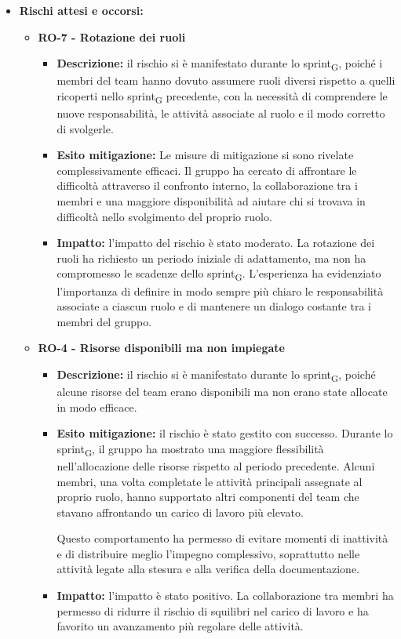 ﻿\documentclass[a4paper, 10pt, colorlinks=true, linkcolor=black, urlcolor=blue, citecolor=blue, hidelinks]{article}
\begin{document}
\begin{itemize}
    \item \textbf{Rischi attesi e occorsi:}

    \begin{itemize}
        \item \textbf{RO-7 - Rotazione dei ruoli}
        \begin{itemize}
            \item \textbf{Descrizione:} il rischio si è manifestato durante lo sprint\textsubscript{G}, poiché i membri del team hanno dovuto assumere ruoli diversi rispetto a quelli ricoperti nello sprint\textsubscript{G} precedente, con la necessità di comprendere le nuove responsabilità, le attività associate al ruolo e il modo corretto di svolgerle.

            \item \textbf{Esito mitigazione:} Le misure di mitigazione si sono rivelate complessivamente efficaci. Il gruppo ha cercato di affrontare le difficoltà attraverso il confronto interno, la collaborazione tra i membri e una maggiore disponibilità ad aiutare chi si trovava in difficoltà nello svolgimento del proprio ruolo.

            \item \textbf{Impatto:} l'impatto del rischio è stato moderato. La rotazione dei ruoli ha richiesto un periodo iniziale di adattamento, ma non ha compromesso le scadenze dello sprint\textsubscript{G}. L'esperienza ha evidenziato l'importanza di definire in modo sempre più chiaro le responsabilità associate a ciascun ruolo e di mantenere un dialogo costante tra i membri del gruppo.
        \end{itemize}
        \item \textbf{RO-4 - Risorse disponibili ma non impiegate}
        \begin{itemize}
            \item \textbf{Descrizione:} il rischio si è manifestato durante lo sprint\textsubscript{G}, poiché alcune risorse del team erano disponibili ma non erano state allocate in modo efficace. 
            \item \textbf{Esito mitigazione:} il rischio è stato gestito con successo. Durante lo sprint\textsubscript{G}, il gruppo ha mostrato una maggiore flessibilità nell'allocazione delle risorse rispetto al periodo precedente. Alcuni membri, una volta completate le attività principali assegnate al proprio ruolo, hanno supportato altri componenti del team che stavano affrontando un carico di lavoro più elevato.

            Questo comportamento ha permesso di evitare momenti di inattività e di distribuire meglio l'impegno complessivo, soprattutto nelle attività legate alla stesura e alla verifica della documentazione.

            \item \textbf{Impatto:} l'impatto è stato positivo. La collaborazione tra membri ha permesso di ridurre il rischio di squilibri nel carico di lavoro e ha favorito un avanzamento più regolare delle attività.
        \end{itemize}
    \end{itemize}
\end{itemize}
\end{document}
